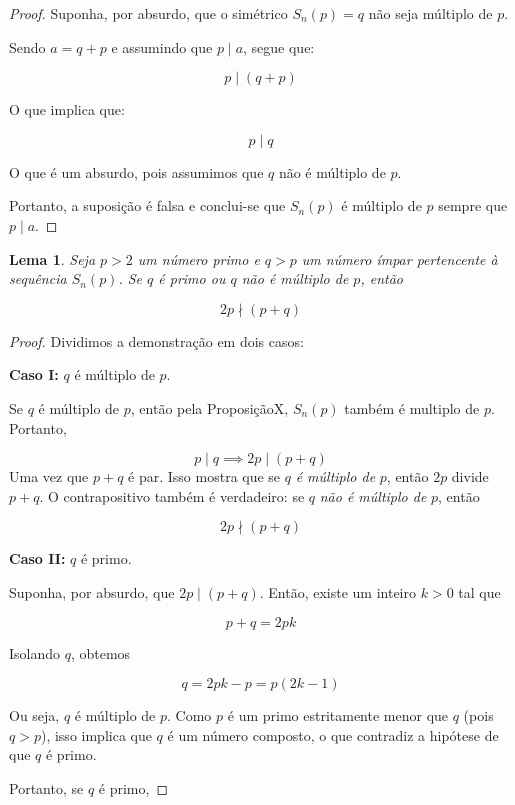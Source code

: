 \documentclass[a4paper,11pt]{article}
\newtheorem{lemma}[theorem]{Lema}
\theoremstyle{definition}
\theoremstyle{remark}
\begin{document}
\begin{otherlanguage}{brazil}
	\begin{proof}
		Suponha, por absurdo, que o simétrico \(S_n(p) = q\) não seja múltiplo de \(p\). 
		
		Sendo \(a = q + p\) e assumindo que \(p \mid a\), segue que:
		
		\[
		p \mid (q + p)
		\]
		
		O que implica que:
		
		\[
		p \mid q
		\]
		
		O que é um absurdo, pois assumimos que \(q\) não é múltiplo de \(p\).
		
		Portanto, a suposição é falsa e conclui-se que \(S_n(p)\) é múltiplo de \(p\) sempre que \(p \mid a\).
	\end{proof}
	
	\begin{lemma}\label{lema:multip}
		Seja \(p > 2\) um número primo e \(q > p\) um número ímpar pertencente à sequência \(S_n(p)\). Se \(q\) é primo ou \(q\) não é múltiplo de \(p\), então
		
		\[
		2p \nmid (p + q)
		\]
	\end{lemma}
	\begin{proof}
		Dividimos a demonstração em dois casos:
		
		\textbf{Caso I:} \(q\) é múltiplo de \(p\).
		
		Se \(q\) é múltiplo de \(p\), então pela ProposiçãoX, \(S_n(p)\) também é multiplo de \(p\). Portanto,
		
		\[
		p \mid q \implies 2p \mid (p + q)
		\]
		Uma vez que \(p + q\) é par.
		Isso mostra que se \(q\) \textit{é múltiplo de} \(p\), então \(2p\) divide \(p + q\). O contrapositivo também é verdadeiro: se \(q\) \textit{não é múltiplo de} \(p\), então
		
		\[
		2p \nmid (p + q)
		\]
		
		\textbf{Caso II:} \(q\) é primo.
		
		Suponha, por absurdo, que \(2p \mid (p + q)\). Então, existe um inteiro \(k > 0\) tal que
		
		\[
		p + q = 2p k
		\]
		
		Isolando \(q\), obtemos
		
		\[
		q = 2p k - p = p(2k - 1)
		\]
		
		Ou seja, \(q\) é múltiplo de \(p\). Como \(p\) é um primo estritamente menor que \(q\) (pois \(q > p\)), isso implica que \(q\) é um número composto, o que contradiz a hipótese de que \(q\) é primo.
		
		Portanto, se \(q\) é primo,
		

\end{proof}
\end{otherlanguage}
\end{document}
